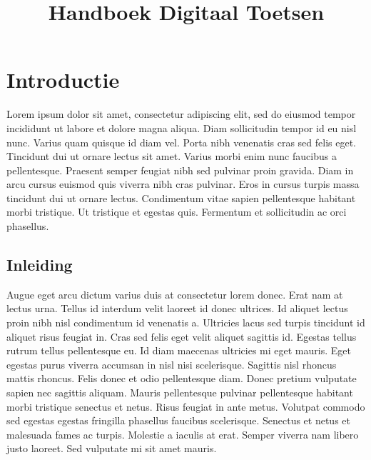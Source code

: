 \documentclass[
  letterpaper,
  DIV=11,
  numbers=noendperiod]{scrreprt}
\title{Handboek Digitaal Toetsen}
\author{}
\date{}
\renewcommand*\contentsname{Table of contents}
\newcommand\contentsname{Table of contents}
\begin{document}
\maketitle
\ifdefined\Shaded\renewenvironment{Shaded}{\begin{tcolorbox}[enhanced, frame hidden, boxrule=0pt, sharp corners, interior hidden, borderline west={3pt}{0pt}{shadecolor}, breakable]}{\end{tcolorbox}}\fi

\renewcommand*\contentsname{Table of contents}
{
\hypersetup{linkcolor=}
\setcounter{tocdepth}{2}
\tableofcontents
}

\hypertarget{introductie}{%
\chapter{Introductie}\label{introductie}}

Lorem ipsum dolor sit amet, consectetur adipiscing elit, sed do eiusmod
tempor incididunt ut labore et dolore magna aliqua. Diam sollicitudin
tempor id eu nisl nunc. Varius quam quisque id diam vel. Porta nibh
venenatis cras sed felis eget. Tincidunt dui ut ornare lectus sit amet.
Varius morbi enim nunc faucibus a pellentesque. Praesent semper feugiat
nibh sed pulvinar proin gravida. Diam in arcu cursus euismod quis
viverra nibh cras pulvinar. Eros in cursus turpis massa tincidunt dui ut
ornare lectus. Condimentum vitae sapien pellentesque habitant morbi
tristique. Ut tristique et egestas quis. Fermentum et sollicitudin ac
orci phasellus.

\hypertarget{inleiding}{%
\section{Inleiding}\label{inleiding}}

Augue eget arcu dictum varius duis at consectetur lorem donec. Erat nam
at lectus urna. Tellus id interdum velit laoreet id donec ultrices. Id
aliquet lectus proin nibh nisl condimentum id venenatis a. Ultricies
lacus sed turpis tincidunt id aliquet risus feugiat in. Cras sed felis
eget velit aliquet sagittis id. Egestas tellus rutrum tellus
pellentesque eu. Id diam maecenas ultricies mi eget mauris. Eget egestas
purus viverra accumsan in nisl nisi scelerisque. Sagittis nisl rhoncus
mattis rhoncus. Felis donec et odio pellentesque diam. Donec pretium
vulputate sapien nec sagittis aliquam. Mauris pellentesque pulvinar
pellentesque habitant morbi tristique senectus et netus. Risus feugiat
in ante metus. Volutpat commodo sed egestas egestas fringilla phasellus
faucibus scelerisque. Senectus et netus et malesuada fames ac turpis.
Molestie a iaculis at erat. Semper viverra nam libero justo laoreet. Sed
vulputate mi sit amet mauris.
\end{document}
